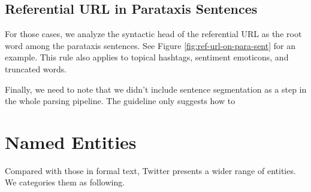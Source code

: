 \documentclass[11pt,a4paper]{article}
\begin{document}
\subsection{Referential URL in Parataxis Sentences}
For those cases, we analyze the syntactic head of the referential URL
as the root word among the parataxis sentences.
See Figure \ref{fig:ref-url-on-para-sent} for an example.
This rule also applies to topical hashtags, sentiment emoticons, and truncated words.

Finally, we need to note that we didn't include sentence segmentation
as a step in the whole parsing pipeline.
The guideline only suggests how to 

\section{Named Entities}
Compared with those in formal text, Twitter presents 
a wider range of entities.
We categories them as following.
\end{document}
